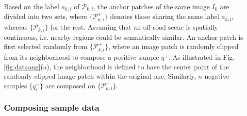 \documentclass[letterpaper, 10 pt, conference]{ieeeconf}  %
\begin{document}
Based on the label $a_{k,i}$ of $\mathcal{P}_{k,i}$, the anchor patches of the same image $I_k$ are divided into two sets, where $\{\mathcal{P}_{k,i}^+\}$ denotes those sharing the same label $a_{k,i}$, whereas $\{\mathcal{P}_{k,i}^-\}$ for the rest.
Assuming that an off-road scene is spatially continuous, i.e. nearby regions could be semantically similar.
An anchor patch is first selected randomly from $\{\mathcal{P}_{k,i}^+\}$, where an image patch is randomly clipped from its neighborhood to compose a positive sample $q^+$. As illustrated in Fig. \ref{fig:dataaug}(a), the neighborhood is defined to have the center point of the randomly clipped image patch within the original one. Similarly, $n$ negative samples $\{q^-_i\}$ are composed on $\{\mathcal{P}_{k,i}^-\}$.

\subsubsection{Composing sample data}
\end{document}
